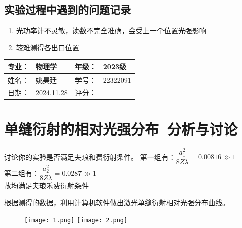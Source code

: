 \documentclass[dvipsnames, svgnames,a4paper,11pt]{article}
\begin{document}
\subsection{实验过程中遇到的问题记录}
\begin{enumerate}
	\item 光功率计不灵敏，读数不完全准确，会受上一个位置光强影响
	\item 较难测得各出口位置
\end{enumerate}


\clearpage
{}
\begin{table}
	\renewcommand\arraystretch{1.7}
	\begin{tabularx}{\textwidth}{|X|X|X|X|}
	\hline
	专业：& 物理学 &年级：& 2023级\\
	\hline
	姓名： &姚昊廷& 学号：&22322091 \\
	\hline
    日期：&2024.11.28 & 评分： &\\
	\hline
	\end{tabularx}
\end{table}

\section{单缝衍射的相对光强分布\ \textbf{分析与讨论}}
\begin{question}
	讨论你的实验是否满足夫琅和费衍射条件。
	\tcblower
第一组有：$\dfrac{a_1^2}{8Z\lambda}=0.00816\gg 1$\\
第二组有：$\dfrac{a_2^2}{8Z\lambda}=0.0287\gg 1$\\
故均满足夫琅禾费衍射条件
\end{question}

\begin{question}
	根据测得的数据，利用计算机软件做出激光单缝衍射相对光强分布曲线。
	\tcblower
	\begin{figure}[H]
		\texttt{[image: 1.png]}
		\texttt{[image: 2.png]}
	\end{figure}
\end{question}
\end{document}
